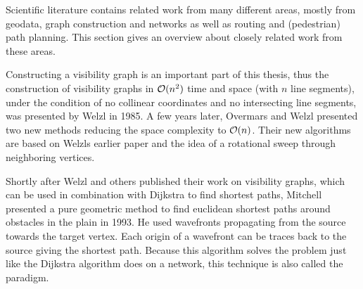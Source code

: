 
Scientific literature contains related work from many different areas, mostly from geodata, graph construction and networks as well as routing and (pedestrian) path planning.
This section gives an overview about closely related work from these areas.

Constructing a visibility graph is an important part of this thesis, thus the construction of visibility graphs in $\mathcal{O}(n^2)$ time and space (with $n$ line segments), under the condition of no collinear coordinates and no intersecting line segments, was presented by Welzl in 1985\cite{welzl-visibility-graph}.
A few years later, Overmars and Welzl presented two new methods reducing the space complexity to $\mathcal{O}(n)$\cite{overmars-weizl-visibility-graph}.
Their new algorithms are based on Welzls earlier paper and the idea of a rotational sweep through neighboring vertices.
	

Shortly after Welzl and others published their work on visibility graphs, which can be used in combination with Dijkstra to find shortest paths, Mitchell presented a pure geometric method to find euclidean shortest paths around obstacles in the plain in 1993\cite{mitchell-shortest-path}.
He used wavefronts propagating from the source towards the target vertex.
Each origin of a wavefront can be traces back to the source giving the shortest path.
Because this algorithm solves the  problem just like the Dijkstra algorithm does on a network, this technique is also called the  paradigm.


